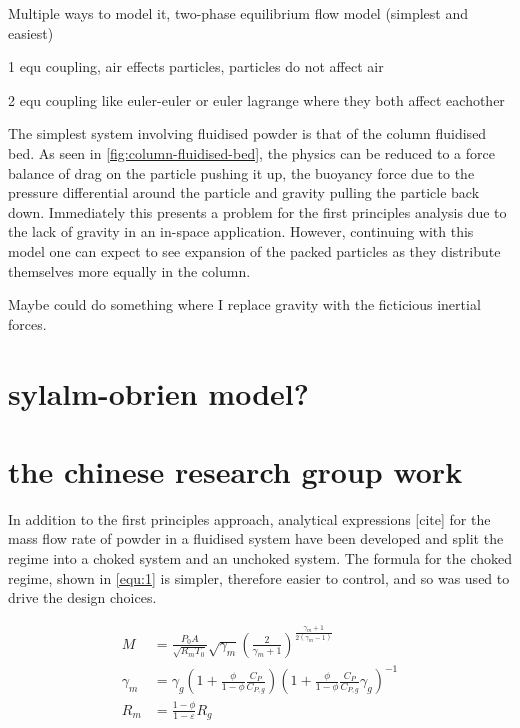 Multiple ways to model it, two-phase equilibrium flow model (simplest and easiest)

1 equ coupling, air effects particles, particles do not affect air

2 equ coupling like euler-euler or euler lagrange where they both affect eachother



The simplest system involving fluidised powder is that of the column fluidised bed. As seen in \autoref{fig:column-fluidised-bed}, the physics can be reduced to a force balance of drag on the particle pushing it up, the buoyancy force due to the pressure differential around the particle and gravity pulling the particle back down. Immediately this presents a problem for the first principles analysis due to the lack of gravity in an in-space application. However, continuing with this model one can expect to see expansion of the packed particles as they distribute themselves more equally in the column.

Maybe could do something where I replace gravity with the ficticious inertial forces. 

\section{sylalm-obrien model?}

\newpage
\section{the chinese research group work}

In addition to the first principles approach, analytical expressions [cite] for the mass flow rate of powder in a fluidised system have been developed and split the regime into a choked system and an unchoked system. The formula for the choked regime, shown in \autoref{equ:1} is simpler, therefore easier to control, and so was used to drive the design choices.

\begin{align}
    M &= \frac{P_0 A}{\sqrt{R_m T_0}} \sqrt{\gamma_m} \left( \frac{2}{\gamma_m + 1} \right)^{\frac{\gamma_m + 1}{2(\gamma_m - 1)}} \\[10pt]
    \gamma_m &= \gamma_g \left( 1 + \frac{\phi}{1 - \phi} \frac{C_P}{C_{P,g}} \right) \left( 1 + \frac{\phi}{1 - \phi} \frac{C_P}{C_{P,g}} \gamma_g \right)^{-1} \\[10pt]
    R_m &= \frac{1 - \phi}{1 - \varepsilon} R_g
\end{align}
    